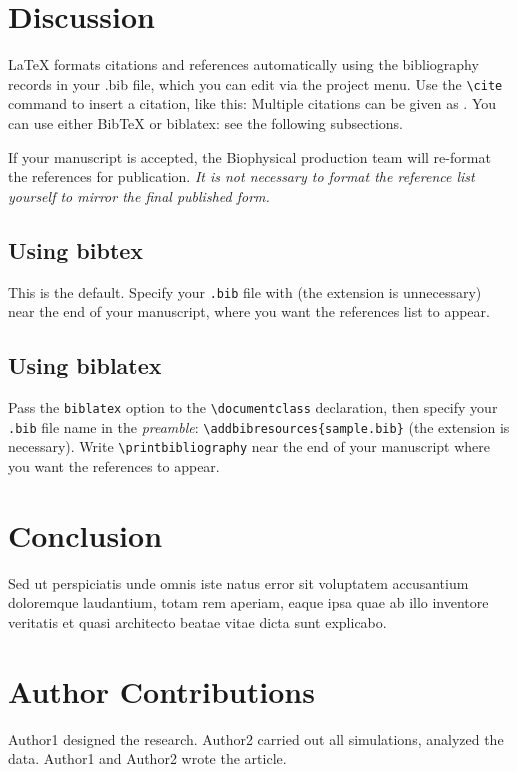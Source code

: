 \documentclass{biophys-new}
\begin{document}
\section*{Discussion}

\LaTeX{} formats citations and references automatically using the bibliography records in your .bib file, which you can edit via the project menu. Use the \verb|\cite| command to insert a citation, like this: \cite{Chen_Nicholson00} Multiple citations can be given as \cite{Stiles_Bartol01,el-Kareh_etal93,Callaghan91}. You can use either BibTeX or biblatex: see the following subsections.

If your manuscript is accepted, the Biophysical production team will re-format the references for publication. \emph{It is not necessary to format the reference list yourself to mirror the final published form.}

\subsection*{Using bibtex} 
This is the default. Specify your \texttt{.bib} file with \verb|| (the extension is unnecessary) near the end of your manuscript, where you want the references list to appear.

\subsection*{Using biblatex} 
Pass the \texttt{biblatex} option to the \verb|\documentclass| declaration, then specify your \texttt{.bib} file name in the \emph{preamble}: \verb|\addbibresources{sample.bib}| (the extension is necessary). Write \verb|\printbibliography| near the end of your manuscript where you want the references to appear.

\section*{Conclusion}

Sed ut perspiciatis unde omnis iste natus error sit voluptatem accusantium doloremque laudantium, totam rem aperiam, eaque ipsa quae ab illo inventore veritatis et quasi architecto beatae vitae dicta sunt explicabo. 

\section*{Author Contributions}

Author1 designed the research. Author2 carried out all simulations, analyzed the data. Author1 and Author2 wrote the article. 
\end{document}
